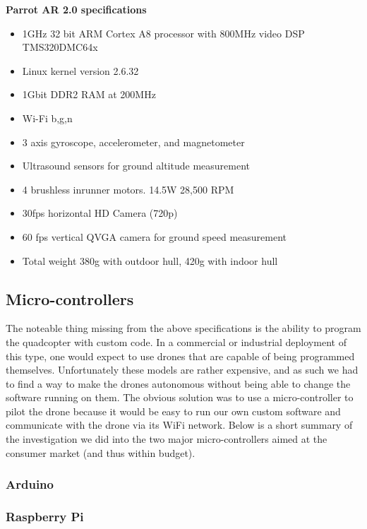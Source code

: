 \begin{aside}
\textbf{Parrot AR 2.0 specifications\cite{parrotspecs}}
\begin{itemize}
\item 1GHz 32 bit ARM Cortex A8 processor with 800MHz video DSP TMS320DMC64x
\item Linux kernel version 2.6.32
\item 1Gbit DDR2 RAM at 200MHz
\item Wi-Fi b,g,n
\item 3 axis gyroscope, accelerometer, and magnetometer
\item Ultrasound sensors for ground altitude measurement
\item 4 brushless inrunner motors. 14.5W 28,500 RPM
\item 30fps horizontal HD Camera (720p)
\item 60 fps vertical QVGA camera for ground speed measurement
\item Total weight 380g with outdoor hull, 420g with indoor hull
\end{itemize}
\end{aside}

\subsection{Micro-controllers}
The noteable thing missing from the above specifications is the ability to program the quadcopter with custom code. In a commercial or industrial deployment of this type, one would expect to use drones that are capable of being programmed themselves. Unfortunately these models are rather expensive, and as such we had to find a way to make the drones autonomous without being able to change the software running on them. The obvious solution was to use a micro-controller to pilot the drone because it would be easy to run our own custom software and communicate with the drone via its WiFi network. Below is a short summary of the investigation we did into the two major micro-controllers aimed at the consumer market (and thus within budget).

\subsubsection{Arduino}

\subsubsection{Raspberry Pi}

